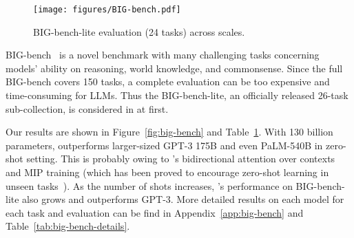 {\begin{figure}[t]
\begin{minipage}{0.72\linewidth}
    \centering
	\texttt{[image: figures/BIG-bench.pdf]}
	\vspace{-2.2mm}
	\caption{BIG-bench-lite evaluation (24 tasks) across scales.}
	\label{fig:big-bench}
\end{minipage}
\begin{minipage}{0.27\linewidth}
\centering
\renewcommand\tabcolsep{1pt}
\renewcommand\arraystretch{1.4}
\vspace{1mm}
\label{tab:big-bench}
\end{minipage}  
\vspace{-5mm}
\end{figure}

BIG-bench~\citep{srivastava2022beyond} is a novel benchmark with many challenging tasks concerning models' ability on reasoning, world knowledge, and commonsense.
Since the full BIG-bench covers 150 tasks, a complete evaluation can be too expensive and time-consuming for LLMs.
Thus the BIG-bench-lite, an officially released 26-task sub-collection, is considered in \glm at first.

Our results are shown in Figure~\ref{fig:big-bench} and Table~\ref{tab:big-bench}.
With 130 billion parameters, \glm outperforms larger-sized GPT-3 175B and even PaLM-540B in zero-shot setting.
This is probably owing to \glm's bidirectional attention over contexts and MIP training (which has been proved to encourage zero-shot learning in unseen tasks~\citep{wei2022finetuned,sanh2022multitask}).
As the number of shots increases, \glm's performance on BIG-bench-lite also grows and outperforms GPT-3.
More detailed results on each model for each task and evaluation can be find in Appendix~\ref{app:big-bench} and Table~\ref{tab:big-bench-details}.

}
